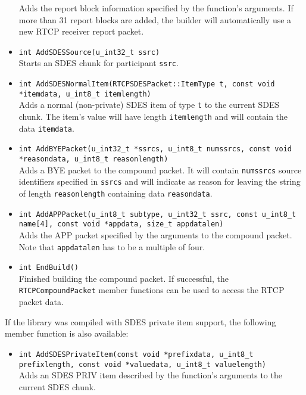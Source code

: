 \documentclass[12pt,a4paper]{article}
\begin{document}
\begin{itemize}
						Adds the report block information specified by the function's
						arguments. If more than 31 report blocks are added, the builder
						will automatically use a new RTCP receiver report packet.
					\item {\tt int AddSDESSource(u\_int32\_t ssrc)}\\
						Starts an SDES chunk for participant {\tt ssrc}.
					\item {\tt int AddSDESNormalItem(RTCPSDESPacket::ItemType t, const void *itemdata, u\_int8\_t itemlength)}\\
						Adds a normal (non-private) SDES item of type {\tt t} to the current SDES
						chunk. The item's value will have length {\tt itemlength} and will contain
						the data {\tt itemdata}.
					\item {\tt int AddBYEPacket(u\_int32\_t *ssrcs, u\_int8\_t numssrcs, const void *reasondata, u\_int8\_t reasonlength)}\\
						Adds a BYE packet to the compound packet. It will contain {\tt numssrcs}
						source identifiers specified in {\tt ssrcs} and will indicate
						as reason for leaving the string of length {\tt reasonlength}
						containing data {\tt reasondata}.
					\item {\tt int AddAPPPacket(u\_int8\_t subtype, u\_int32\_t ssrc, const u\_int8\_t name[4], const void *appdata, size\_t appdatalen)}\\
						Adds the APP packet specified by the arguments to the
						compound packet. Note that {\tt appdatalen} has to be
						a multiple of four.
					\item {\tt int EndBuild()}\\
						Finished building the compound packet. If successful, the
						{\tt RTCPCompoundPacket} member functions can be used to
						access the RTCP packet data.
				\end{itemize}

				If the library was compiled with SDES private item support, the
				following member function is also available:
				\begin{itemize}
					\item {\tt int AddSDESPrivateItem(const void *prefixdata, u\_int8\_t prefixlength, const void *valuedata,
	                                                  u\_int8\_t valuelength)}\\
						Adds an SDES PRIV item described by the function's arguments
						to the current SDES chunk.
				\end{itemize}
\end{document}

